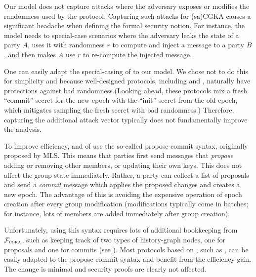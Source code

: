 \begin{description}[itemsep=0pt]
	\item [No randomness corruptions]
	Our model does not capture attacks where the adversary exposes or modifies the randomness used by the protocol.
	Capturing such attacks for (sa)CGKA causes a significant headache when defining the formal security notion. For instance, the model needs to special-case scenarios where the adversary leaks the state of a party $A$, uses it with randomness $r$ to compute and inject a message to a party $B$, and then makes $A$ use $r$ to re-compute the injected message.
	
	One can easily adapt the special-casing of \cite{TCC:ACJM20,EPRINT:AlwJosMul20,hashimoto2021cmpke} to our model. We chose not to do this for simplicity and because well-designed protocols, including \protITK and \saik, naturally have protections against bad randomness.(Looking ahead, these protocols mix a fresh ``commit'' secret for the new epoch with the ``init'' secret from the old epoch, which mitigates sampling the fresh secret with bad randomness.) Therefore, capturing the additional attack vector typically does not fundamentally improve the analysis.
	
	
	\item [Simplified syntax]
	To improve efficiency, \protITK and \protCMPKE of \cite{hashimoto2021cmpke} use the so-called propose-commit syntax, originally proposed by MLS. This means that parties first send messages that \emph{propose} adding or removing other members, or updating their own keys. This does not affect the group state immediately. Rather, a party can collect a list of proposals and send a \emph{commit} message which applies the proposed changes and creates a new epoch.
	The advantage of this is avoiding the expensive operation of epoch creation after every group modification (modifications typically come in batches; for instance, lots of members are added immediately after group creation).
	
	Unfortunately, using this syntax requires lots of additional bookkeeping from $\mathcal{F}_{\normalfont\textsc{cgka}}$, such as keeping track of two types of history-graph nodes, one for proposals and one for commits (see  \cite{EPRINT:AlwJosMul20,hashimoto2021cmpke}). Most protocols based on \protITK, such as \saik, can be easily adapted to the propose-commit syntax and benefit from the efficiency gain. The change is minimal and security proofs are clearly not affected. %
	


\end{description}
